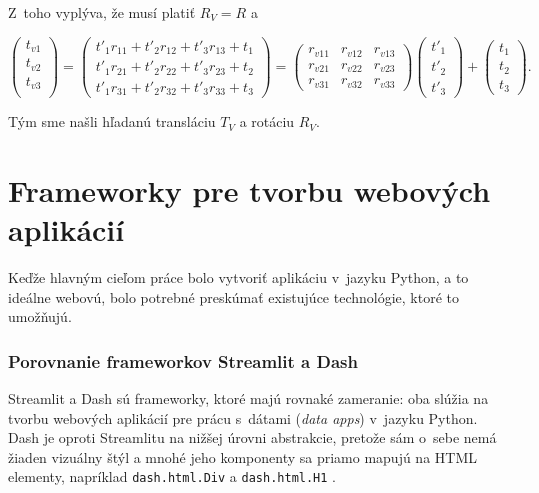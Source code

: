 Z~toho vyplýva, že musí platiť $R_V = R$ a

$$
    \begin{pmatrix}
    t_{v1} \\
    t_{v2} \\
    t_{v3} \\
    \end{pmatrix}
    =
    \begin{pmatrix}
    t'_1 r_{11} + t'_2 r_{12} + t'_3 r_{13} + t_1 \\
    t'_1 r_{21} + t'_2 r_{22} + t'_3 r_{23} + t_2 \\
    t'_1 r_{31} + t'_2 r_{32} + t'_3 r_{33} + t_3
    \end{pmatrix}
    =
    \begin{pmatrix}
    r_{v11} & r_{v12} & r_{v13} \\
    r_{v21} & r_{v22} & r_{v23} \\
    r_{v31} & r_{v32} & r_{v33}
    \end{pmatrix}
    \begin{pmatrix}
    t'_1 \\
    t'_2 \\
    t'_3
    \end{pmatrix}
    +
    \begin{pmatrix}
    t_1 \\
    t_2 \\
    t_3
    \end{pmatrix} \mathrm{.}
$$

Tým sme našli hľadanú transláciu $T_V$ a rotáciu $R_V$.

\section{Frameworky pre tvorbu webových aplikácií}

Keďže hlavným cieľom práce bolo vytvoriť aplikáciu v~jazyku Python, a to ideálne webovú, bolo potrebné preskúmať existujúce technológie, ktoré to umožňujú.

\subsubsection{Porovnanie frameworkov Streamlit a Dash}

Streamlit a Dash sú frameworky, ktoré majú rovnaké zameranie: oba slúžia na tvorbu webových aplikácií pre prácu s~dátami (\emph{data apps}) v~jazyku Python. Dash je oproti Streamlitu na nižšej úrovni abstrakcie, pretože sám o~sebe nemá žiaden vizuálny štýl a mnohé jeho komponenty sa priamo mapujú na HTML elementy, napríklad \texttt{dash.html.Div} a \texttt{dash.html.H1} \cite{dash_documentation, streamlit_documentation}.

